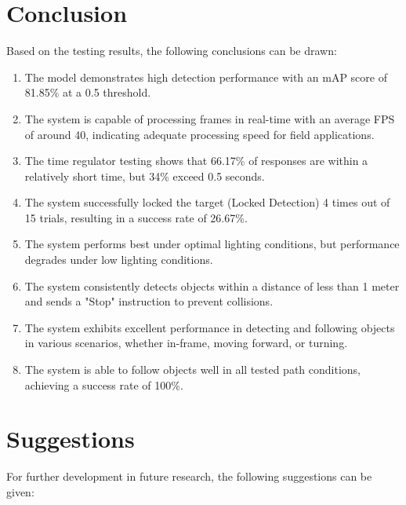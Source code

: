 \section{Conclusion}
\label{sec:conclusion}


Based on the testing results, the following conclusions can be drawn:

\begin{enumerate}
  \item The model demonstrates high detection performance with an mAP score of 81.85\% at a 0.5 threshold.
  \item The system is capable of processing frames in real-time with an average FPS of around 40, indicating adequate processing speed for field applications.
  \item The time regulator testing shows that 66.17\% of responses are within a relatively short time, but 34\% exceed 0.5 seconds.
  \item The system successfully locked the target (Locked Detection) 4 times out of 15 trials, resulting in a success rate of 26.67\%.
  \item The system performs best under optimal lighting conditions, but performance degrades under low lighting conditions.
  \item The system consistently detects objects within a distance of less than 1 meter and sends a "Stop" instruction to prevent collisions.
  \item The system exhibits excellent performance in detecting and following objects in various scenarios, whether in-frame, moving forward, or turning.
  \item The system is able to follow objects well in all tested path conditions, achieving a success rate of 100\%.
\end{enumerate}

\section{Suggestions}
\label{chap:suggestions}

For further development in future research, the following suggestions can be given:

